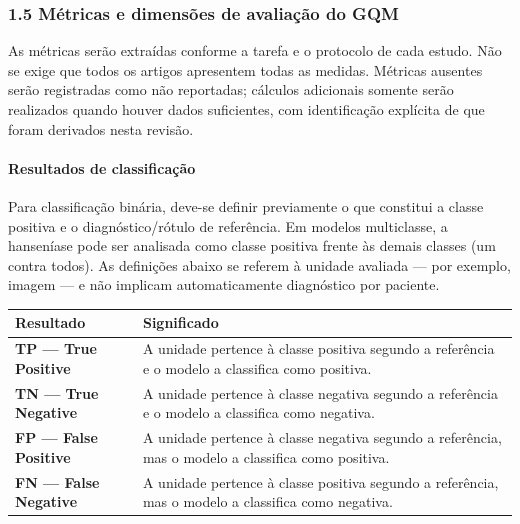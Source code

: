 \documentclass[
]{article}
\newcounter{none} %
\begin{document}
\subsubsection{1.5 Métricas e dimensões de avaliação do
GQM}\label{muxe9tricas-e-dimensuxf5es-de-avaliauxe7uxe3o-do-gqm}

As métricas serão extraídas conforme a tarefa e o protocolo de cada
estudo. Não se exige que todos os artigos apresentem todas as medidas.
Métricas ausentes serão registradas como não reportadas; cálculos
adicionais somente serão realizados quando houver dados suficientes, com
identificação explícita de que foram derivados nesta revisão.

\paragraph{Resultados de
classificação}\label{resultados-de-classificauxe7uxe3o}

Para classificação binária, deve-se definir previamente o que constitui
a classe positiva e o diagnóstico/rótulo de referência. Em modelos
multiclasse, a hanseníase pode ser analisada como classe positiva frente
às demais classes (um contra todos). As definições abaixo se referem à
unidade avaliada --- por exemplo, imagem --- e não implicam
automaticamente diagnóstico por paciente.

{\def\LTcaptype{none} %
\begin{longtable}[]{@{}
  >{\raggedright\arraybackslash}p{}
  >{\raggedright\arraybackslash}p{}@{}}
\toprule\noalign{}
\begin{minipage}[b]{\linewidth}\raggedright
Resultado
\end{minipage} & \begin{minipage}[b]{\linewidth}\raggedright
Significado
\end{minipage} \\
\midrule\noalign{}
\endhead
\bottomrule\noalign{}
\endlastfoot
\textbf{TP --- True Positive} & A unidade pertence à classe positiva
segundo a referência e o modelo a classifica como positiva. \\
\textbf{TN --- True Negative} & A unidade pertence à classe negativa
segundo a referência e o modelo a classifica como negativa. \\
\textbf{FP --- False Positive} & A unidade pertence à classe negativa
segundo a referência, mas o modelo a classifica como positiva. \\
\textbf{FN --- False Negative} & A unidade pertence à classe positiva
segundo a referência, mas o modelo a classifica como negativa. \\
\end{longtable}
}
\end{document}

